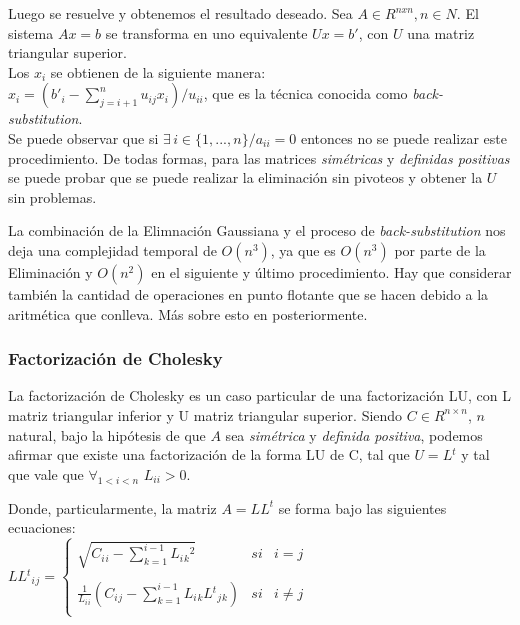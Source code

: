 Luego se resuelve y obtenemos el resultado deseado. Sea $A \in R^{nxn}, n \in N$. El sistema $Ax = b$ se transforma en uno equivalente $Ux = b'$, con $U$ una matriz triangular superior. \\

Los $x{_i}$ se obtienen de la siguiente manera: \\

$x{_i} = (b'{_i} - \sum\limits_{j = i + 1}^n u_{ij}x_{i}) / u_{ii}$, que es la técnica conocida como \textit{back-substitution}. \\

Se puede observar que si $\exists \, i \in \{1, ..., n\} / a_{ii} = 0$ entonces no se puede realizar este procedimiento. De todas formas, para las matrices \textit{sim\'etricas} y \textit{definidas positivas} se puede probar que se puede realizar la eliminaci\'on sin pivoteos y obtener la $U$ sin problemas.

La combinaci\'on de la Elimnaci\'on Gaussiana y el proceso de \textit{back-substitution} nos deja una complejidad temporal de $O(n^{3})$, ya que es $O(n^{3})$ por parte de la Eliminaci\'on y $O(n^{2})$ en el siguiente y \'ultimo procedimiento. Hay que considerar tambi\'en la cantidad de operaciones en punto flotante que se hacen debido a la aritm\'etica que conlleva. M\'as sobre esto en posteriormente.

\subsubsection{Factorizaci\'on de Cholesky} \label{intro_cholesky}

La factorizaci\'on de Cholesky es un caso particular de una factorizaci\'on LU, con L matriz triangular inferior y U matriz triangular superior. Siendo $C \in R^{n \times n}$, $n$ natural, bajo la hip\'otesis de que $A$ sea \textit{sim\'etrica} y \textit{definida positiva}, podemos afirmar que existe una factorizaci\'on de la forma LU de C, tal que $U = L{^t}$ y tal que vale que $\displaystyle\mathop{\forall}_{1 < i < n}$ $L_{ii} > 0$.

Donde, particularmente, la matriz $A = LL^{t}$ se forma bajo las siguientes ecuaciones: \\

$LL{^t}{_i}{_j} =
\left\{
	\begin{array}{lcc}
		\sqrt{C{_i}{_i} - \sum\limits_{k=1}^{i-1} L{_i}{_k}^2} & si & i = j \\
		\\ \frac{1}{L{_i}{_i}}(C{_i}{_j} - \sum\limits_{k=1}^{i-1} L{_i}{_k}L{^t}{_j}{_k}) & si & i \neq j \\
	\end{array}
\right.$ \\

